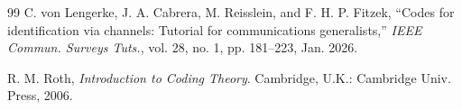 \begin{thebibliography}{99}
C. von Lengerke, J. A. Cabrera, M. Reisslein, and F. H. P. Fitzek, ``Codes for identification via channels: Tutorial for communications generalists,'' \emph{IEEE Commun. Surveys Tuts.}, vol. 28, no. 1, pp. 181--223, Jan. 2026.


R. M. Roth, \emph{Introduction to Coding Theory}. Cambridge, U.K.: Cambridge Univ. Press, 2006.




\end{thebibliography}

